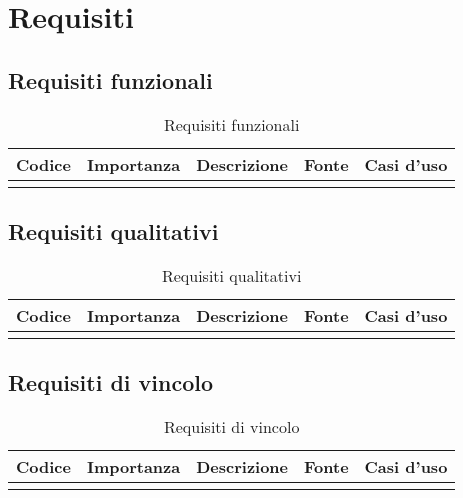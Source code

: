 \section{Requisiti}
\subsection{Requisiti funzionali}
\begin{table}[!h]
    \begin{center}
        \begin{tabular}{ |l |l |l |l| l| }
            \hline 
            \textbf{Codice} & \textbf{Importanza} & \textbf{Descrizione} & \textbf{Fonte} & \textbf{Casi d'uso}\\\hline
                            &                     &                      &                &                    \\
            
            \hline
        \end{tabular}
    \end{center}
    \caption{Requisiti funzionali}
    \label{tab:1}
\end{table}

\subsection{Requisiti qualitativi}
\begin{table}[!h]
    \begin{center}
        \begin{tabular}{ |l |l |l |l| l| }
            \hline 
            \textbf{Codice} & \textbf{Importanza} & \textbf{Descrizione} & \textbf{Fonte} & \textbf{Casi d'uso}\\\hline
                            &                     &                      &                &                    \\
            
            \hline
        \end{tabular}
    \end{center}
    \caption{Requisiti qualitativi}
    \label{tab:2}
\end{table}

\subsection{Requisiti di vincolo}
\begin{table}[!h]
    \begin{center}
        \begin{tabular}{ |l |l |l |l| l| }
            \hline 
            \textbf{Codice} & \textbf{Importanza} & \textbf{Descrizione} & \textbf{Fonte} & \textbf{Casi d'uso}\\\hline
                            &                     &                      &                &                    \\
            
            \hline
        \end{tabular}
    \end{center}
    \caption{Requisiti di vincolo}
    \label{tab:3}
\end{table}

